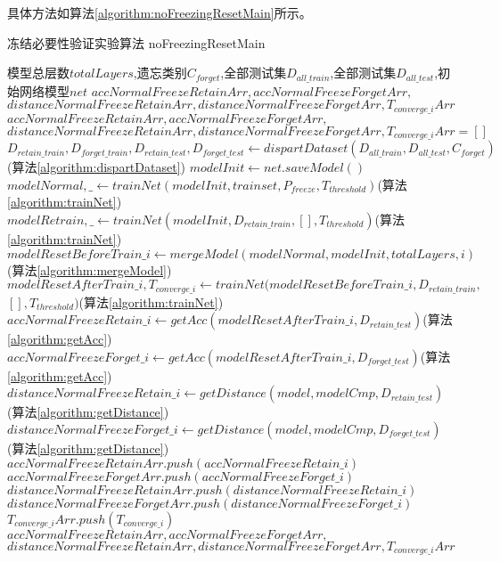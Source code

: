具体方法如算法\ref{algorithm:noFreezingResetMain}所示。
\begin{algorithm}
	\renewcommand{\algorithmicrequire}{\textbf{Input:}}
	\renewcommand{\algorithmicensure}{\textbf{Output:}}
	\caption{冻结必要性验证实验算法 noFreezingResetMain}
	\label{algorithm:noFreezingResetMain}
	\begin{algorithmic}[1]
        \REQUIRE 模型总层数$totalLayers$,遗忘类别$C_{forget}$,全部测试集$D_{all\_train}$,全部测试集$D_{all\_test}$,初始网络模型$net$
        \ENSURE  $accNormalFreezeRetainArr,accNormalFreezeForgetArr,$\\$distanceNormalFreezeRetainArr,distanceNormalFreezeForgetArr,T_{converge\_i}Arr$
        \STATE $accNormalFreezeRetainArr,accNormalFreezeForgetArr,$\\$distanceNormalFreezeRetainArr,distanceNormalFreezeForgetArr,T_{converge\_i}Arr = []$
        \STATE $D_{retain\_train}, D_{forget\_train}, D_{retain\_test}, D_{forget\_test} \gets dispartDataset(D_{all\_train}, D_{all\_test}, C_{forget})$(算法\ref{algorithm:dispartDataset})
        \STATE $modelInit \gets net.saveModel()$
        \STATE $modelNormal,\_ \gets trainNet(modelInit, trainset, P_{freeze}, T_{threshold})$(算法\ref{algorithm:trainNet})
        \STATE $modelRetrain,\_ \gets trainNet(modelInit, D_{retain\_train}, [], T_{threshold})$(算法\ref{algorithm:trainNet})
            \STATE $modelResetBeforeTrain\_i \gets mergeModel(modelNormal, modelInit, totalLayers, i)$(算法\ref{algorithm:mergeModel})
            \STATE $modelResetAfterTrain\_i,T_{converge\_i} \gets trainNet(modelResetBeforeTrain\_i , D_{retain\_train},$\\$ [], T_{threshold})$(算法\ref{algorithm:trainNet})
            \STATE $accNormalFreezeRetain\_i \gets getAcc(modelResetAfterTrain\_i, D_{retain\_test})$(算法\ref{algorithm:getAcc})
            \STATE $accNormalFreezeForget\_i  \gets getAcc(modelResetAfterTrain\_i, D_{forget\_test})$(算法\ref{algorithm:getAcc})
            \STATE $distanceNormalFreezeRetain\_i \gets getDistance(model, modelCmp, D_{retain\_test})$(算法\ref{algorithm:getDistance})
            \STATE $distanceNormalFreezeForget\_i \gets getDistance(model, modelCmp, D_{forget\_test})$(算法\ref{algorithm:getDistance})
            \STATE $accNormalFreezeRetainArr.push(accNormalFreezeRetain\_i)$
            \STATE $accNormalFreezeForgetArr.push(accNormalFreezeForget\_i)$
            \STATE $distanceNormalFreezeRetainArr.push(distanceNormalFreezeRetain\_i)$
            \STATE $distanceNormalFreezeForgetArr.push(distanceNormalFreezeForget\_i)$
            \STATE $T_{converge\_i}Arr.push(T_{converge\_i})$
        \ENDFOR
        \RETURN $accNormalFreezeRetainArr,accNormalFreezeForgetArr,$\\$distanceNormalFreezeRetainArr,distanceNormalFreezeForgetArr,T_{converge\_i}Arr$
	\end{algorithmic}  
\end{algorithm}

